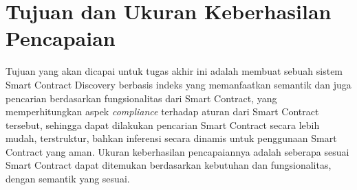\section{Tujuan dan Ukuran Keberhasilan Pencapaian}
\label{sec:tujuan-ukuran-keberhasilan-pencapaian}


Tujuan yang akan dicapai untuk tugas akhir ini adalah membuat sebuah sistem Smart Contract Discovery berbasis indeks yang memanfaatkan semantik dan juga pencarian berdasarkan fungsionalitas dari Smart Contract, yang memperhitungkan aspek \textit{compliance} terhadap aturan dari Smart Contract tersebut, sehingga dapat dilakukan pencarian Smart Contract secara lebih mudah, terstruktur, bahkan inferensi secara dinamis untuk penggunaan Smart Contract yang aman. Ukuran keberhasilan pencapaiannya adalah seberapa sesuai Smart Contract dapat ditemukan berdasarkan kebutuhan dan fungsionalitas, dengan semantik yang sesuai.